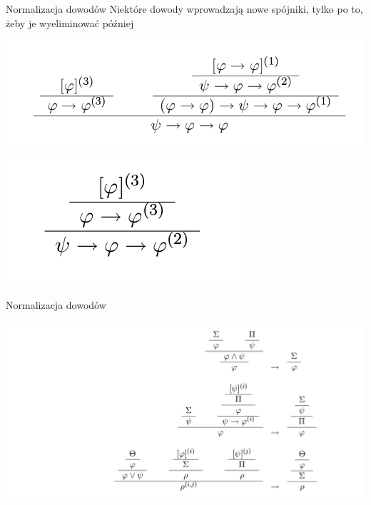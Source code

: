 \documentclass{beamer}
\begin{document}
\begin{frame}{Normalizacja dowodów}
Niektóre dowody wprowadzają nowe spójniki, tylko po to, żeby je wyeliminować później
\begin{example}
\includegraphics[scale=0.25]{duzy_dowod.png}
\includegraphics[scale=0.25]{maly_dowod.png}
\end{example}
\end{frame}

\begin{frame}{Normalizacja dowodów}

\includegraphics[scale=0.25]{elim_ded.png}

\end{frame}
\end{document}
